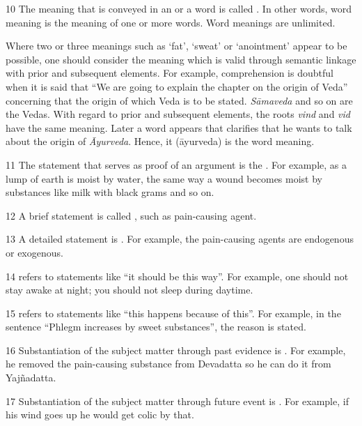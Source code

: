 \begin{translation}
\item [10] The meaning that is conveyed in an  or a word is 
called . In other words, word meaning is the 
meaning of one or more words. Word meanings are unlimited. 

   Where two or three meanings such as `fat’, `sweat’ or `anointment’ appear to be possible, one should consider the meaning which is valid through semantic linkage with prior and subsequent elements. For example, comprehension is doubtful when it is said that “We are going to explain the chapter on the origin of Veda” concerning that the origin of which Veda is to be stated. \emph{Sāmaveda} and so on are the Vedas. With regard to prior and subsequent elements, the roots \emph{vind} and \emph{vid} have the same meaning. Later a word appears that clarifies that he wants to talk about the origin of \emph{Āyurveda}. Hence, it (āyurveda) is the word meaning.  

\item [11] The statement that serves as proof of an argument is the 
. For example, as a lump of earth is moist by water, the 
same way a wound becomes moist by substances like milk with black grams and 
so on.  

\item [12] A brief statement is called , such as 
 {pain-causing agent}. 

\item [13] A detailed statement is . For example, the 
pain-causing agents are endogenous or exogenous. 

\item [14]  refers to statements like ``it should be this way''. For example, one should not stay awake at night; 
you should not sleep during daytime.  

\item [15]  refers to statements like “this happens because of this”. For example, in the sentence “Phlegm 
increases by sweet substances”, the reason is stated.  

\item [16] Substantiation of the subject matter through past evidence is . 
For example, he removed the pain-causing substance 
from Devadatta so he can do it from Yajñadatta. 

\item [17] Substantiation of the subject matter through future event is 
. For example, if his wind goes up he would get colic by that. 


\end{translation}
